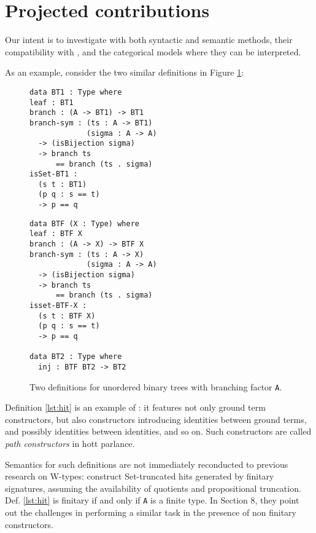 \documentclass[a4paper]{article}
\begin{document}
\section{Projected contributions}

Our intent is to investigate  with both syntactic and semantic methods, their compatibility with , and the categorical models where they can be interpreted.

As an example, consider the two similar definitions in Figure \ref{fig:trdefs}:

\bgroup
\renewcommand{\lstlistingname}{Definition}
\begin{figure}
	\caption{Two definitions for unordered binary trees with branching factor \texttt{A}.}
	\label{fig:trdefs}
	\centering
	\begin{minipage}{.45\textwidth}
		\begin{lstlisting}[caption={\gls{hit} based},label={lst:hit}]
data BT1 : Type where
leaf : BT1
branch : (A -> BT1) -> BT1
branch-sym : (ts : A -> BT1)
             (sigma : A -> A)
  -> (isBijection sigma)
  -> branch ts 
      == branch (ts . sigma)
isSet-BT1 :
  (s t : BT1)
  (p q : s == t)
  -> p == q
\end{lstlisting}
	\end{minipage}
	\qquad
	\begin{minipage}{.45\textwidth}
		\begin{lstlisting}[caption={Initial algebra based},label={lst:fix}]
data BTF (X : Type) where
leaf : BTF X
branch : (A -> X) -> BTF X
branch-sym : (ts : A -> X)
             (sigma : A -> A)
  -> (isBijection sigma)
  -> branch ts 
      == branch (ts . sigma)
isset-BTF-X :
  (s t : BTF X)
  (p q : s == t)
  -> p == q

data BT2 : Type where
  inj : BTF BT2 -> BT2
\end{lstlisting}
	\end{minipage}
\end{figure}
\egroup

Definition \ref{lst:hit} is an example of : it features not only ground term constructors, but also constructors introducing identities between ground terms, and possibly identities between identities, and so on. Such constructors are called \textit{path constructors} in \gls{hott} parlance.

Semantics for such definitions are not immediately reconducted to previous research on W-types: \textcite{Weide2019} construct Set-truncated \glspl{hit} generated by finitary signatures, assuming the availability of quotients and propositional truncation. Def. \ref{lst:hit} is finitary if and only if \texttt{A} is a finite type. In Section 8, they point out the challenges in performing a similar task in the presence of non finitary constructors.
\end{document}
